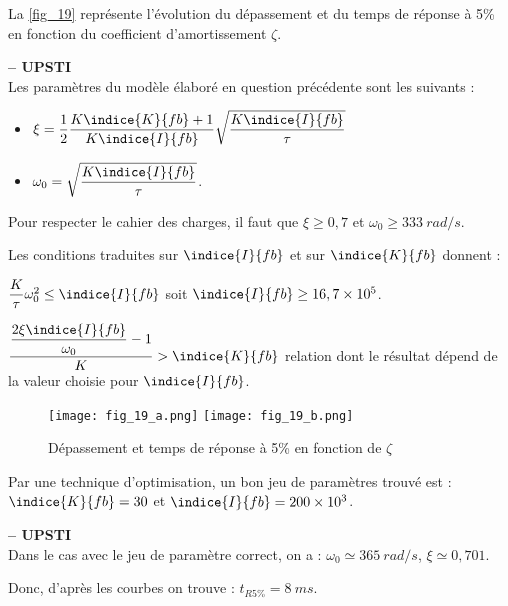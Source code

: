 La \autoref{fig_19} représente l'évolution du dépassement et du temps de réponse à 5\% en fonction du
coefficient d'amortissement $\zeta$.

\ifprof
\begin{corrige}\textbf{ -- UPSTI}\\ 
Les paramètres du modèle élaboré en question précédente sont les suivants :
\begin{itemize}
\item  $\xi=\dfrac{1}{2} \dfrac{K\indice{K}{fb}+1}{K\indice{I}{fb}}\sqrt{\dfrac{K\indice{I}{fb}}{\tau}}$
\item  $\omega_0 = \sqrt{\dfrac{K\indice{I}{fb}}{\tau}}$.
\end{itemize}
Pour respecter le cahier des charges, il faut que $\xi \geq 0,7$ et $\omega_0 \geq \SI{333}{rad/s}$.


Les conditions traduites sur $\indice{I}{fb}$ et sur $\indice{K}{fb}$ donnent :

$\dfrac{K}{\tau} \omega_0^2 \leq \indice{I}{fb}$ soit $\indice{I}{fb}\geq 16,7\times 10^5$.

$\dfrac{\dfrac{2\xi \indice{I}{fb}}{\omega_0}-1}{K} > \indice{K}{fb}$
relation dont le résultat dépend de la valeur choisie pour $\indice{I}{fb}$.

\end{corrige}
\else
\fi

\ifprof\else
\begin{figure}[H]
\centering
\texttt{[image: fig\_19\_a.png]}
\texttt{[image: fig\_19\_b.png]}
\caption{Dépassement et temps de réponse à 5\% en fonction de $\zeta$ \label{fig_19}}
\end{figure}


Par une technique d’optimisation, un bon jeu de paramètres trouvé est : $\indice{K}{fb}=30$ et $\indice{I}{fb}=200\times10^{3}$.
\fi

\ifprof
\begin{corrige}\textbf{ -- UPSTI}\\ 
Dans le cas avec le jeu de paramètre correct, on a : $\omega_0 \simeq \SI{365}{rad/s}$, $\xi \simeq 0,701$.

Donc, d’après les courbes on trouve : $t_{R5\%} = \SI{8}{ms}$.


\end{corrige}
\else
\fi

